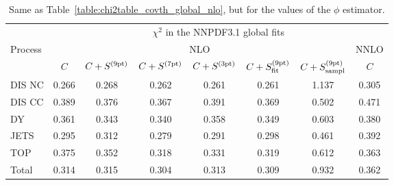 \begin{table}[t]
\begin{center}
\renewcommand*{\arraystretch}{1.78}
\footnotesize
\begin{tabular}{|l|c|ccc|cc|c|}
  \toprule
  & \multicolumn{7}{c|}{$\chi^2$ in the NNPDF3.1 global fits}   \\
 Process & \multicolumn{6}{c|}{NLO}  & NNLO  \\
 & $C$ & $C+S^{(\rm 9pt)}$   &  $C+S^{(\rm 7pt)}$  &  $C+S^{(\rm 3pt)}$ & $C+S^{(\rm 9pt)}_{\rm fit}$ &
  $C+S^{(\rm 9pt)}_{\rm sampl}$   &  $C$ \\
\toprule
DIS NC    & 0.266  & 0.268   & 0.262 & 0.261 & 0.261 & 1.137 & 0.305 \\
DIS CC    & 0.389  & 0.376   & 0.367 & 0.391 & 0.369 & 0.502 & 0.471 \\
\midrule  
DY        & 0.361  & 0.343   & 0.340 & 0.358 & 0.349 & 0.603 & 0.380 \\
JETS      & 0.295  & 0.312   & 0.279 & 0.291 & 0.298 & 0.461 & 0.392 \\
TOP       & 0.375  & 0.352   & 0.318 & 0.331 & 0.319 & 0.612 & 0.363 \\
\midrule
Total     & 0.314  & 0.315   & 0.304 & 0.313 & 0.309 & 0.932 & 0.362 \\
\bottomrule
\end{tabular}
\end{center}
\caption{Same as Table~\ref{table:chi2table_covth_global_nlo}, but 
  for the values of the $\phi$ estimator.
  \label{table:phitable_covth_global_nlo}
}
  \end{table}
